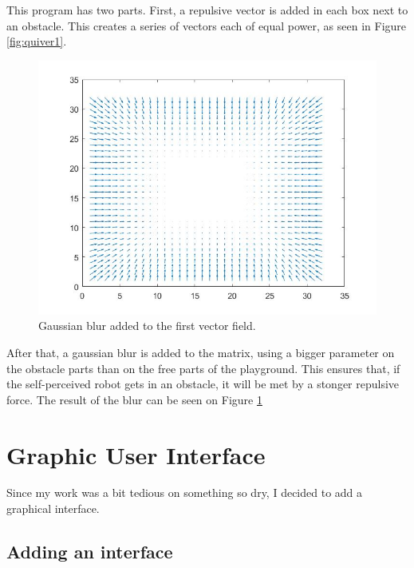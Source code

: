  This program has two parts. First, a repulsive vector is added in each box next to an obstacle.
 This creates a series of vectors each of equal power, as seen in Figure \ref{fig:quiver1}.\\

 \begin{figure}[H]
 \centering
 \includegraphics[scale=0.4]{Figures/quiver2}
 \decoRule
 \caption[Blurred Quiver]{Gaussian blur added to the first vector field.}
 \label{fig:quiver2}
 \end{figure}

 After that, a gaussian blur is added to the matrix, using a bigger parameter on the obstacle parts than on the free parts of the playground.
 This ensures that, if the self-perceived robot gets in an obstacle, it will be met by a stonger repulsive force.
 The result of the blur can be seen on Figure \ref{fig:quiver2}\\



%

\section{Graphic User Interface}

Since my work was a bit tedious on something so dry, I decided to add a graphical interface.

\subsection{Adding an interface}

